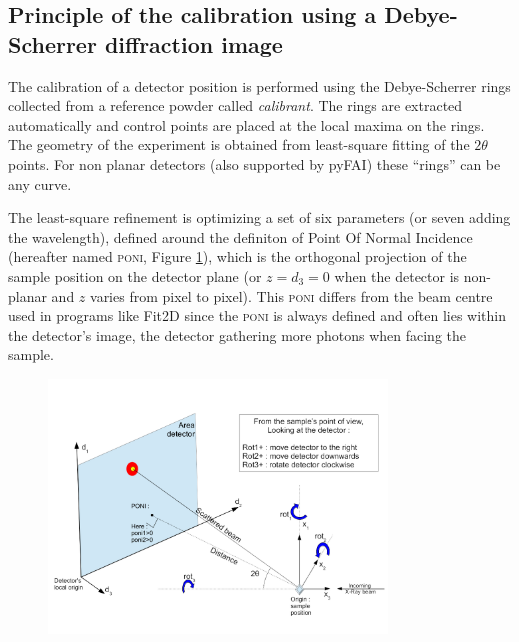 \documentclass[preprint, pdf]{iucr}              %
\let\caption\foo
\begin{document}
\subsection{Principle of the calibration using a Debye-Scherrer diffraction
image}
The calibration of a detector position is performed using the Debye-Scherrer
rings collected from a reference powder called \textit{calibrant}.
The rings are extracted automatically and control points are placed at the
local maxima on the rings.
The geometry of the experiment is obtained from least-square fitting of
the $2\theta$ points.
For non planar detectors (also supported by pyFAI) these ``rings'' can
be any curve.

The least-square refinement is optimizing a set of six parameters
(or seven adding the wavelength), defined around the definiton of Point
Of Normal Incidence (hereafter named \textsc{poni}, Figure \ref{poni}), which is
the orthogonal projection  of the sample position on the detector plane (or
$z=d_3=0$ when the detector is non-planar and $z$ varies from pixel to pixel).
This \textsc{poni} differs from the beam centre used in programs like
Fit2D \cite{fit2d} since the \textsc{poni} is always defined and often lies
within the detector's image, the detector gathering more photons 
when facing the sample.

\begin{figure}
\label{poni}
\begin{center}
\includegraphics[width=9cm]{images/PONI.png}
\caption{Geometry used in pyFAI.}
\end{center}
\end{figure}
\end{document}
